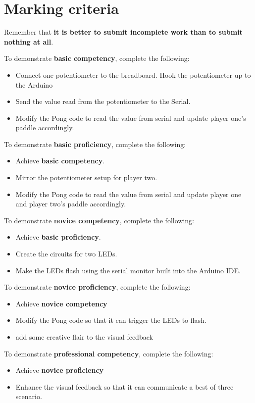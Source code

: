\documentclass{../../../fal_assignment}
\begin{document}
\section*{Marking criteria}

Remember that \textbf{it is better to submit incomplete work than to submit nothing at all}. 

To demonstrate \textbf{basic competency}, complete the following:
\begin{itemize}
	\item Connect one potentiometer to the breadboard. Hook the potentiometer up to the Arduino
	\item Send the value read from the potentiometer to the Serial.
	\item Modify the Pong code to read the value from serial and update player one's paddle accordingly.
\end{itemize} 

To demonstrate \textbf{basic proficiency}, complete the following:
\begin{itemize}
	\item Achieve \textbf{basic competency}.
	\item Mirror the potentiometer setup for player two.
	\item Modify the Pong code to read the value from serial and update player one and player two's paddle accordingly.
\end{itemize}

To demonstrate \textbf{novice competency}, complete the following:
\begin{itemize}
	\item Achieve \textbf{basic proficiency}.
	\item Create the circuits for two LEDs.
	\item Make the LEDs flash using the serial monitor built into the Arduino IDE.
\end{itemize}

To demonstrate \textbf{novice proficiency}, complete the following:
\begin{itemize}
	\item Achieve \textbf{novice competency}
	\item Modify the Pong code so that it can trigger the LEDs to flash.
	\item add some creative flair to the visual feedback
\end{itemize}

To demonstrate \textbf{professional competency}, complete the following:
\begin{itemize}
	\item Achieve \textbf{novice proficiency}
	\item Enhance the visual feedback so that it can communicate a best of three scenario.
\end{itemize}
\end{document}
